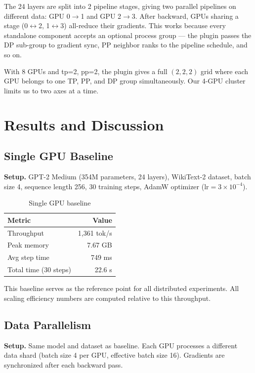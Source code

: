\documentclass[conference]{IEEEtran}
\begin{document}
The 24 layers are split into 2 pipeline stages, giving two parallel pipelines on different data: GPU 0$\rightarrow$1 and GPU 2$\rightarrow$3. After backward, GPUs sharing a stage (0$\leftrightarrow$2, 1$\leftrightarrow$3) all-reduce their gradients. This works because every standalone component accepts an optional process group --- the plugin passes the DP sub-group to gradient sync, PP neighbor ranks to the pipeline schedule, and so on.

With 8 GPUs and tp=2, pp=2, the plugin gives a full $(2,2,2)$ grid where each GPU belongs to one TP, PP, and DP group simultaneously. Our 4-GPU cluster limits us to two axes at a time.


\section{Results and Discussion}

\subsection{Single GPU Baseline}

\textbf{Setup.} GPT-2 Medium (354M parameters, 24 layers), WikiText-2 dataset, batch size 4, sequence length 256, 30 training steps, AdamW optimizer ($\text{lr}=3\times10^{-4}$).

\begin{table}[h]
\centering
\caption{Single GPU baseline}
\label{tab:baseline}
\begin{tabular}{lr}
\toprule
\textbf{Metric} & \textbf{Value} \\
\midrule
Throughput & 1,361 tok/s \\
Peak memory & 7.67 GB \\
Avg step time & 749 ms \\
Total time (30 steps) & 22.6 s \\
\bottomrule
\end{tabular}
\end{table}

This baseline serves as the reference point for all distributed experiments. All scaling efficiency numbers are computed relative to this throughput.

\subsection{Data Parallelism}

\textbf{Setup.} Same model and dataset as baseline. Each GPU processes a different data shard (batch size 4 per GPU, effective batch size 16). Gradients are synchronized after each backward pass.
\end{document}
